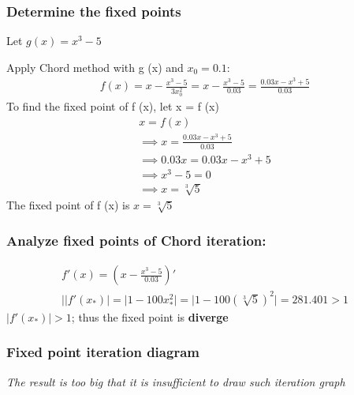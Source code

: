 \subsubsection{Determine the fixed points}
Let $g(x) = x^{3} - 5$

Apply Chord method with g (x) and $x_0 = 0.1$:
\begin{align*}
    f(x) = x - \frac{x^{3} - 5}{3x_{0}^{2}}
    = x - \frac{x^{3} - 5}{0.03}
    = \frac{0.03x - x^{3} + 5}{0.03}
\end{align*}
To find the fixed point of f (x), let x = f (x)
\begin{align*}
    x = f(x) \\
    \implies x = \frac{0.03x - x^{3} + 5}{0.03} \\
    \implies 0.03x = 0.03x - x^{3} + 5 \\
    \implies x^{3} - 5 = 0 \\
    \implies x = \sqrt[3]{5}
\end{align*}
The fixed point of f (x) is $x = \sqrt[3]{5}$

\subsubsection{Analyze fixed points of Chord iteration:}
\begin{align*}
    f'(x) = (x - \frac{x^{3} - 5}{0.03})'\\
    ||f'(x_{*})| = |1- 100x_{*}^2| = |1 - 100(\sqrt[3]{5})^{2}|
    = 281.401 > 1
\end{align*}
$|f'(x_{*})| > 1$; thus the fixed point is \textbf{diverge} 

\subsubsection{Fixed point iteration diagram}
\textit{The result is too big that it is insufficient to draw such iteration graph}

